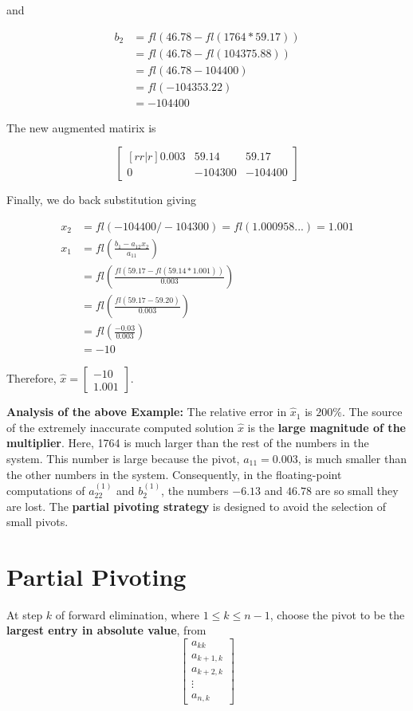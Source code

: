 \documentclass [titlepage,12pt,letter] {article}
\begin{document}
and

\begin{align*}
b_2&=fl(46.78-fl(1764*59.17)) \\
&=fl(46.78-fl(104375.88)) \\
&=fl(46.78-104400) \\
&=fl(-104353.22) \\
&=-104400
\end{align*}

The new augmented matirix is

\[
\begin{bmatrix}[rr|r]
	0.003	&	59.14	&	59.17 \\
	0		&	-104300 &	 -104400
\end{bmatrix}
\]

Finally, we do back substitution giving

\begin{align*}
x_2&=fl(-104400/-104300)=fl(1.000958...)=1.001 \\
x_1&=fl\left(\frac{b_1-a_{12}x_2}{a_{11}}\right) \\
&=fl\left(\frac{fl(59.17-fl(59.14*1.001))}{0.003}\right) \\
&=fl\left(\frac{fl(59.17-59.20)}{0.003}\right) \\
&= fl\left(\frac{-0.03}{0.003}\right) \\
&= -10
\end{align*}

Therefore, $\hat{x}=\begin{bmatrix}-10 \\ 1.001 \end{bmatrix}$.

\noindent
{\bf Analysis of the above Example:}
The relative error in $\hat{x}_1$ is $200\%$. The source of the extremely inaccurate computed solution $\hat{x}$ is the {\bf large magnitude of the multiplier}. Here, 1764 is much larger than the rest of the numbers in the system. 
This number is large because the pivot, $a_{11}=0.003$, is much smaller than the other numbers in the system. Consequently, in the floating-point computations of $a_{22}^{(1)}$ and $b_2^{(1)}$, the numbers $-6.13$ and $46.78$ are so small they are lost. The {\bf partial pivoting strategy} is designed to avoid the selection of small pivots.

\section{Partial Pivoting}

At step $k$ of forward elimination, where $1 \leq k \leq n-1$, choose the pivot to be the {\bf largest entry in absolute value}, from
\[
\begin{bmatrix}
	a_{kk} \\
	a_{k+1,k} \\
	a_{k+2,k} \\
	\vdots \\
	a_{n,k}
\end{bmatrix}
\]
\end{document}
